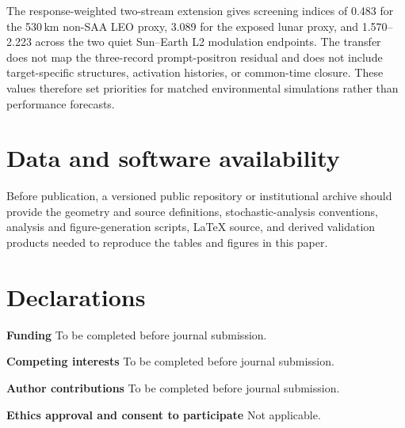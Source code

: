 \documentclass[11pt]{article}
\begin{document}
The response-weighted two-stream extension gives screening indices of 0.483
for the 530\,km non-SAA LEO proxy, 3.089 for the exposed lunar proxy, and
1.570--2.223 across the two quiet Sun--Earth L2 modulation endpoints. The
transfer does not map the three-record prompt-positron residual and does not
include target-specific structures, activation histories, or common-time
closure. These values therefore set priorities for matched environmental
simulations rather than performance forecasts.

\section*{Data and software availability}
Before publication, a versioned public repository or institutional archive should provide the geometry and source definitions, stochastic-analysis conventions, analysis and figure-generation scripts, LaTeX source, and derived validation products needed to reproduce the tables and figures in this paper.

\section*{Declarations}
\textbf{Funding} To be completed before journal submission.

\textbf{Competing interests} To be completed before journal submission.

\textbf{Author contributions} To be completed before journal submission.

\textbf{Ethics approval and consent to participate} Not applicable.
\end{document}

